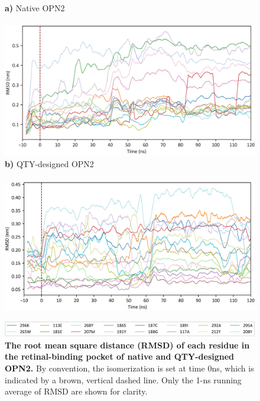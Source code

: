 \documentclass[fleqn,12pt]{supp}
\begin{document}
\begin{figure}[H]
    \caption{\textbf{The root mean square distance (RMSD) of each residue in the retinal-binding pocket of native and QTY-designed OPN2. } By convention, the isomerization is set at time 0ns, which is indicated by a brown, vertical dashed line. Only the 1-ns running average of RMSD are shown for clarity. }
    \textbf{a)} Native OPN2 \\ \\
    \includegraphics[width=\linewidth]{SuppFigures/wt rmsd byres.jpg}
    \textbf{b)} QTY-designed OPN2 \\ \\
    \includegraphics[width=\linewidth]{SuppFigures/qty rmsd byres.jpg}
    
    \vspace{0.5cm}
    \includegraphics[width=\linewidth]{SuppFigures/legend rmsd byres.jpg}
\end{figure}
\end{document}
